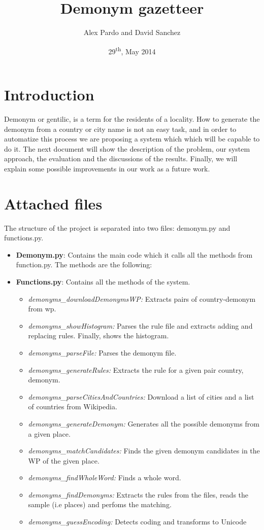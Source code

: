 \documentclass[]{report}
\title{Demonym gazetteer}
\date{29\textsuperscript{th}, May 2014}
\author{Alex Pardo and David Sanchez}
\begin{document}
\maketitle

\tableofcontents

\newpage

\section{Introduction}

Demonym or gentilic, is a term for the residents of a locality. 
How to generate the demonym from a country or city name is not an easy task, and in order to automatize this process we are proposing a system which which will be capable to do it. 
The next document will show the description of the problem, our system approach, the evaluation and the discussions of the results. Finally, we will explain some possible improvements in our work as a future work.

\section{Attached files}

The structure of the project is separated into two files: demonym.py and functions.py.
\begin{itemize}
\item \textbf{Demonym.py}: Contains the main code which it calls all the methods from function.py. The methods are the following:

\item \textbf{Functions.py}:  Contains all the methods of the system.
\begin{itemize}
\item  \textit{demonyms\_downloadDemonymsWP:} Extracts pairs of country-demonym from wp.
\item  \textit{demonyms\_showHistogram:} Parses the rule file and extracts adding and replacing rules. Finally, shows the histogram.
\item  \textit{demonyms\_parseFile:} Parses the demonym file.
\item  \textit{demonyms\_generateRules:} Extracts the rule for a given pair country, demonym.
\item  \textit{demonyms\_parseCitiesAndCountries:} Download a list of cities  and a list of countries from Wikipedia.
\item  \textit{demonyms\_generateDemonym:} Generates all the possible demonyms from a given place.
\item  \textit{demonyms\_matchCandidates:} Finds the given demonym candidates in the WP of the given place.
\item  \textit{demonyms\_findWholeWord:} Finds a whole word.
\item  \textit{demonyms\_findDemonyms:} Extracts the rules from the files, reads the sample (i.e places) and perfoms the matching.
\item  \textit{demonyms\_guessEncoding:} Detects coding and transforms to Unicode
\end{itemize}
\end{itemize}
\end{document}
